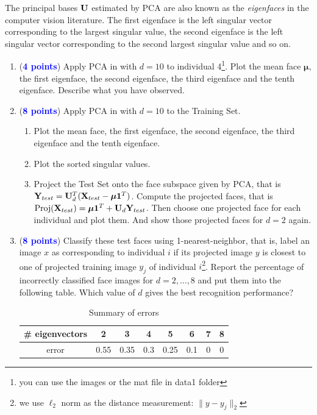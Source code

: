 \documentclass[english,onecolumn]{IEEEtran}
\newcommand{\bY}{{\bf Y}}
\newcommand{\bX}{{\bf X}}
\newcommand{\bmu}{{\boldsymbol \mu}}
\newcommand{\bone}{{\boldsymbol 1}}
\newcommand{\bU}{{\bf U}}
\begin{document}
The principal bases $\bU$ estimated by PCA are also known as the \textit{eigenfaces} in the computer vision literature. The first eigenface is the left singular vector corresponding to the largest singular value, the second eigenface is the left singular vector corresponding to the second largest singular value and so on.

\begin{enumerate}
    \item (\textcolor{blue}{\textbf{4 points}}) Apply PCA in  with $d = 10$ to individual 4\footnote{you can use the images or the mat file in data1 folder}. Plot the mean face $\bmu$, the first eigenface, the second eigenface, the third eigenface and the tenth eigenface. Describe what you have observed.
    \item (\textcolor{blue}{\textbf{8 points}}) Apply PCA in  with $d = 10$ to the Training Set. 
    \begin{enumerate}
        \item Plot the mean face, the first eigenface, the second eigenface, the third eigenface and the tenth eigenface.
        \item Plot the sorted singular values.
        \item Project the Test Set onto the face subspace given by PCA, that is $\bY_{test} = \bU_d^T(\bX_{test}-\bmu \bone^T)$. Compute the projected faces, that is $\text{Proj}(\bX_{test}) = \bmu \bone^T + \bU_d\bY_{test}$. Then choose one projected face for each individual and plot them. And show those projected faces for $d = 2$ again.
    \end{enumerate} 
    \item (\textcolor{blue}{\textbf{8 points}}) Classify these test faces using 1-nearest-neighbor, that is, label an image $x$ as corresponding to individual $i$ if its projected image $y$ is closest to one of projected training image $y_j$ of individual $i$\footnote{we use $\ell_2$ norm as the distance measurement: $ \|y-y_j\|_2$}. Report the percentage of incorrectly classified face images for $d = 2,...,8$ and put them into the following table. Which value of $d$ gives the best recognition performance?
    \begin{table}[h]
        \centering
        \caption{Summary of errors}
        \begin{tabular}{c|c|c|c|c|c|c|c}
        \# eigenvectors& 2 & 3& 4 & 5 & 6 & 7 & 8 \\ 
        \hline
            error & 0.55 & 0.35 & 0.3 & 0.25 & 0.1 & 0 & 0 
        \end{tabular}
        \label{tab:my_label}
    \end{table}
\end{enumerate}
\end{document}
